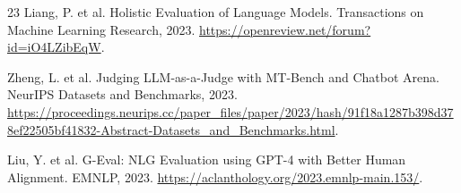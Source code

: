 \documentclass{article}
\begin{document}
\begin{thebibliography}{23}
Liang, P. et al.
Holistic Evaluation of Language Models.
Transactions on Machine Learning Research, 2023.
\url{https://openreview.net/forum?id=iO4LZibEqW}.

Zheng, L. et al.
Judging LLM-as-a-Judge with MT-Bench and Chatbot Arena.
NeurIPS Datasets and Benchmarks, 2023.
\url{https://proceedings.neurips.cc/paper_files/paper/2023/hash/91f18a1287b398d378ef22505bf41832-Abstract-Datasets_and_Benchmarks.html}.

Liu, Y. et al.
G-Eval: NLG Evaluation using GPT-4 with Better Human Alignment.
EMNLP, 2023.
\url{https://aclanthology.org/2023.emnlp-main.153/}.

\end{thebibliography}
\end{document}
